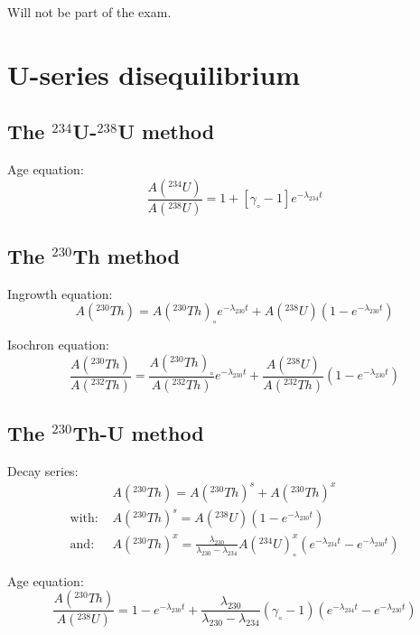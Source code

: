 \documentclass{article}
\begin{document}
\begin{multicols}{3}
Will not be part of the exam.

\section[U-series dating]{U-series disequilibrium}
\label{ch:intro2Useries}

\subsection{The $^{234}$U-$^{238}$U method}
\label{sec:234238}

Age equation:
\begin{equation}
\frac{A(^{234}U)}{A(^{238}U)} = 1 + [ \gamma_\circ - 1 ] e^{-\lambda_{234}t} 
\label{eq:A234A238}
\end{equation}

\subsection{The $^{230}$Th method}
\label{sec:230}

Ingrowth equation:
\begin{equation}
A(^{230}Th) = A(^{230}Th)_\circ e^{-\lambda_{230}t} + A(^{238}U)(1-e^{-\lambda_{230}t})
\label{eq:A230}
\end{equation}

Isochron equation:
\begin{equation}
  \frac{A(^{230}Th)}{A(^{232}Th)} =
  \frac{A(^{230}Th)_\circ}{A(^{232}Th)} e^{-\lambda_{230}t} + 
  \frac{A(^{238}U)}{A(^{232}Th)}(1-e^{-\lambda_{230}t})
\label{eq:230232}
\end{equation}

\subsection{The $^{230}$Th-U method}
\label{sec:230238}

Decay series:
\begin{align}
~ & A(^{230}Th) =  A(^{230}Th)^s + A(^{230}Th)^x \label{eq:230total}\\
\mbox{with:~} & A(^{230}Th)^s = A(^{238}U) (1-e^{-\lambda_{230}t}) \label{eq:230s}\\
\mbox{and:~} & A(^{230}Th)^x = \frac{\lambda_{230}}{\lambda_{230}-\lambda_{234}} 
A(^{234}U)_\circ^x\left(e^{-\lambda_{234}t}-e^{-\lambda_{230}t}\right) \label{eq:230x}
\end{align}

Age equation:
\begin{equation}
  \frac{A(^{230}Th)}{A(^{238}U)} = 1 - e^{-\lambda_{230}t} +
  \frac{\lambda_{230}}{\lambda_{230}-\lambda_{234}} (\gamma_\circ-1)
\left(e^{-\lambda_{234}t}-e^{-\lambda_{230}t}\right)
\label{eq:230238}
\end{equation}


\end{multicols}
\end{document}

